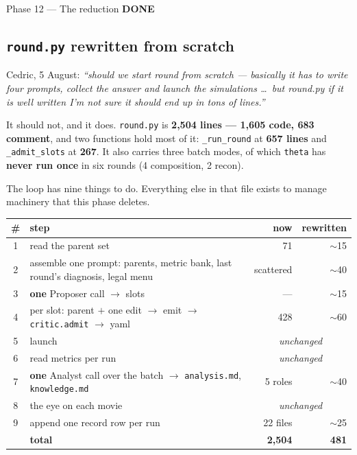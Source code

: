 \documentclass[11pt,a4paper]{article}
\newcommand{\code}[1]{\texttt{#1}}
\newcommand{\done}{\textcolor{good}{\textbf{DONE}}}
\begin{document}
\begin{phasebox}{Phase 12 --- The reduction \hfill \done}
\subsection*{\code{round.py} rewritten from scratch}
Cedric, 5 August: \emph{``should we start round from scratch --- basically it has to write four
prompts, collect the answer and launch the simulations \dots\ but round.py if it is well written I'm
not sure it should end up in tons of lines.''}

It should not, and it does. \code{round.py} is \textbf{2{,}504 lines --- 1{,}605 code, 683 comment},
and two functions hold most of it: \code{\_run\_round} at \textbf{657 lines} and
\code{\_admit\_slots} at \textbf{267}. It also carries three batch modes, of which \code{theta} has
\textbf{never run once} in six rounds (4 composition, 2 recon).

The loop has nine things to do. Everything else in that file exists to manage machinery that this
phase deletes.

\begin{center}\small
\begin{tabular}{clrr}
\toprule
\# & step & now & rewritten \\
\midrule
1 & read the parent set                                              & 71  & $\sim$15 \\
2 & assemble one prompt: parents, metric bank, last round's diagnosis, legal menu & scattered & $\sim$40 \\
3 & \textbf{one} Proposer call $\to$ slots                           & --- & $\sim$15 \\
4 & per slot: parent $+$ one edit $\to$ emit $\to$ \code{critic.admit} $\to$ yaml & 428 & $\sim$60 \\
5 & launch                                                           & \multicolumn{2}{c}{\emph{unchanged}} \\
6 & read metrics per run                                             & \multicolumn{2}{c}{\emph{unchanged}} \\
7 & \textbf{one} Analyst call over the batch $\to$ \code{analysis.md}, \code{knowledge.md} & 5 roles & $\sim$40 \\
8 & the eye on each movie                                            & \multicolumn{2}{c}{\emph{unchanged}} \\
9 & append one record row per run                                    & 22 files & $\sim$25 \\
\midrule
  & \textbf{total}                                                   & \textbf{2{,}504} & \textbf{481} \\
\bottomrule
\end{tabular}
\end{center}


\end{phasebox}
\end{document}
